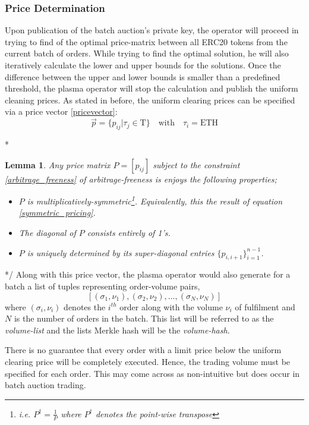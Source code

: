 \documentclass[11pt,parskip=full]{scrartcl}%
\newcommand{\Tau}{\mathrm{T}}
\newtheorem{lemma}[theorem]{Lemma}
\newcommand*{\erc}{ERC20 }
\begin{document}
\subsubsection*{Price Determination}
Upon publication of the batch auction's private key, the operator will proceed in trying to find of the optimal price-matrix between all \erc tokens from the current batch of orders. 
While trying to find the optimal solution, he will also iteratively calculate the lower and upper bounds for the solutions. Once the difference between the upper and lower bounds is smaller than a predefined threshold, the plasma operator will stop the calculation and publish the uniform cleaning prices.\newline
As stated in before, the uniform clearing prices can be specified via a price vector \ref{pricevector}:
\begin{equation}
\vec{p}=\{ p_{ij}| \tau_j \in \Tau \} \quad \text{with} \quad \tau_i =\text{ETH}
\end{equation}

\/* 
\begin{lemma}
Any price matrix $P = [p_{ij}]$ subject to the constraint \ref{arbitrage_freeness} of arbitrage-freeness is enjoys the following properties;
\begin{itemize}
\item[(i)] $P$ is multiplicatively-symmetric\footnote{i.e. $P^\dagger = \frac{1}{P}$ where $P^\dagger$ denotes the point-wise transpose}. Equivalently, this the result of equation \ref{symmetric_pricing}.
\item[(ii)] The diagonal of $P$ consists entirely of 1's.
\item[(iii)]  $P$ is uniquely determined by its super-diagonal entries $\{p_{i, i+1}\}_{i=1}^{n-1}$.
\end{itemize}
\end{lemma}
*/
Along with this price vector, the plasma operator would also generate for a batch a list of tuples representing order-volume pairs, 
\[[(\sigma_1, \nu_1), (\sigma_2,  \nu_2), \dots, (\sigma_N, \nu_N)]\]
where $(\sigma_i, \nu_i)$ denotes the $i^{th}$ order along with the volume $\nu_i$ of fulfilment and $N$ is the number of orders in the batch. 
This list will be referred to as the \emph{volume-list}\label{volumeBlock} and the lists Merkle hash will be the \emph{volume-hash}.

There is no guarantee that every order with a limit price below the uniform clearing price will be completely executed. Hence, the trading volume must be specified for each order.
This may come across as non-intuitive but does occur in batch auction trading.
\end{document}

